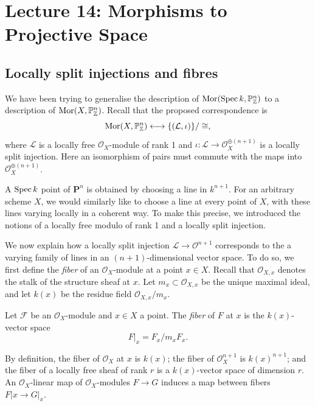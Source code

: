 \newpage
\setcounter{section}{13}

\section*{Lecture 14: Morphisms to Projective Space}

\subsection*{Locally split injections and fibres}

We have been trying to generalise the description of
\(\operatorname{Mor}(\operatorname{Spec} k,\mathbb{P}^n_{\mathbb{Z}})\) to a description of
\(\operatorname{Mor}(X,\mathbb{P}^n_{\mathbb{Z}})\). Recall that the proposed correspondence is
\[
    \operatorname{Mor}(X,\mathbb{P}^n_{\mathbb{Z}})
    \longleftrightarrow
    \{(\mathcal{L},\iota)\}/\cong,
\]
where \(\mathcal{L}\) is a locally free \(\mathcal{O}_X\)-module of rank 1
and \(\iota:\mathcal{L}\to\mathcal{O}_X^{\oplus(n+1)}\) is a locally split
injection. Here an isomorphism of pairs must commute with the maps into
\(\mathcal{O}_X^{\oplus(n+1)}\).

A \(\operatorname{Spec} k\) point of \(\mathbf{P}^{n}\) is obtained by choosing a line
in \(k^{n+1}\). For an arbitrary scheme \(X\), we would similarly like to
choose a line at every point of \(X\), with these lines varying locally in
a coherent way.
To make this precise, we introduced the notions of a locally free
modulo of rank 1 and a locally split injection.

We now explain how a locally split injection \(\mathcal{L} \to
\mathcal{O}^{n+1}\) corresponds to the a varying family of lines in
an \((n+1)\)-dimensional vector space.
To do so, we first define the \emph{fiber} of an
\(\mathcal{O}_X\)-module at a point \(x \in X\).
Recall that \(\mathcal{O}_{X,x}\) denotes the stalk of the structure
sheaf at \(x\).
Let \(m_x \subset \mathcal{O}_{X,x}\) be the unique maximal ideal,
and let \(k(x)\) be the residue field \(\mathcal{O}_{X,x}/m_x\).
\begin{definition}
    Let \(\mathcal{F}\) be an \(\mathcal{O}_X\)-module and \(x \in X\) a point.
    The \emph{fiber} of \(F\) at \(x\) is the \(k(x)\)-vector space
    \[ F|_x = F_x/m_xF_x.\]
\end{definition}
By definition, the fiber of \(\mathcal{O}_X\) at \(x\) is \(k(x)\);
the fiber of \(\mathcal{O}_X^{n+1}\) is  \(k(x)^{n+1}\); and the
fiber of a locally free sheaf of rank \(r\) is a \(k(x)\)-vector
space of dimension \(r\).
An \(\mathcal{O}_X\)-linear map of \(\mathcal{O}_X\)-modules \(F \to
G\) induces a map between fibers \(F|x \to G|_x\).

